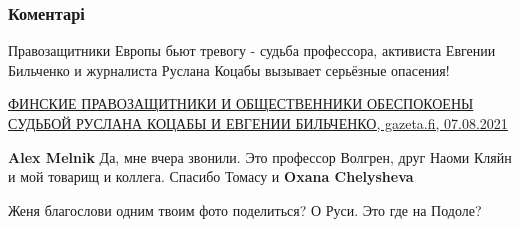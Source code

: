  
 
 
 
 
\subsubsection{Коментарі}

\begin{itemize}
 

Правозащитники Европы бьют тревогу - судьба профессора, активиста Евгении
Бильченко и журналиста Руслана Коцабы вызывает серьёзные опасения!

\href{https://gazeta.fi/imeyu-pravo/finskie-pravozashhitniki-i-obshhestvenniki-obespokoeny-sudboj-ruslana-koczaby-i-evgenii-bilchenko/}{%
ФИНСКИЕ ПРАВОЗАЩИТНИКИ И ОБЩЕСТВЕННИКИ ОБЕСПОКОЕНЫ СУДЬБОЙ РУСЛАНА КОЦАБЫ И ЕВГЕНИИ БИЛЬЧЕНКО, %
gazeta.fi, 07.08.2021%
}

\begin{itemize}
 
\textbf{Alex Melnik} Да, мне вчера звонили. Это профессор Волгрен, друг Наоми
Кляйн и мой товарищ и коллега. Спасибо Томасу и \textbf{Oxana Chelysheva}
\end{itemize}

 
Женя благослови одним твоим фото поделиться? О Руси. Это где на Подоле?

\begin{itemize}
 

\end{itemize}
\end{itemize}
